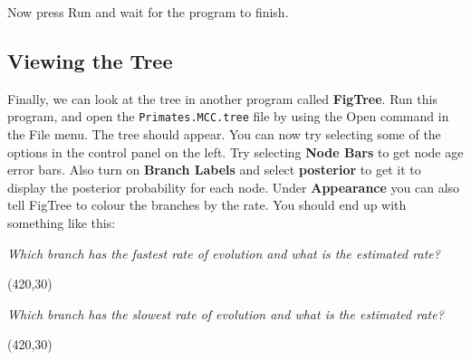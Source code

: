 \documentclass[12pt]{article}
\begin{document}
Now press Run and wait for the program to finish.

\subsection*{Viewing the Tree}
Finally, we can look at the tree in another program called {\bf FigTree}. Run this program, and open
the \texttt{Primates.MCC.tree} file by using the Open command in the File menu. The tree should appear.
You can now try selecting some of the options in the control panel on the left. Try selecting
{\bf Node Bars} to get node age error bars. Also turn on {\bf Branch Labels} and select {\bf posterior} to get
it to display the posterior probability for each node. Under {\bf Appearance} you can also tell FigTree
to colour the branches by the rate.
You should end up with something like this:

\medskip{}


\medskip{}

\textit{Which branch has the fastest rate of evolution and what is the estimated rate?}

 \vspace{5 mm}
 \framebox(420,30){}
  \vspace{5 mm}


\textit{Which branch has the slowest rate of evolution and what is the estimated rate?}
 
 \vspace{5 mm}
 \framebox(420,30){}
   \vspace{5 mm}
\end{document}
